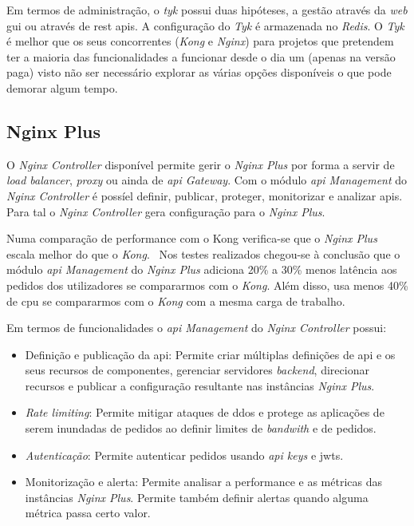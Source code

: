 Em termos de administração, o \textit{tyk} possui duas hipóteses, a gestão através da \textit{web} \acrshort{gui} ou através de \acrshort{rest} \acrshort{api}s. A configuração do \textit{Tyk} é armazenada no \textit{Redis}. O \textit{Tyk} é melhor que os seus concorrentes (\textit{Kong} e \textit{Nginx}) para projetos que pretendem ter a maioria das funcionalidades a funcionar desde o dia um (apenas na versão paga) visto não ser necessário explorar as várias opções disponíveis o que pode demorar algum tempo.~\cite{compAPIGat}

\subsection{Nginx Plus}

O \textit{Nginx Controller} disponível permite gerir o \textit{Nginx Plus} por forma a servir de \textit{load balancer}, \textit{proxy} ou ainda de \textit{\acrshort{api} Gateway}. Com o módulo \textit{\acrshort{api} Management} do \textit{Nginx Controller} é possíel definir, publicar, proteger, monitorizar e analizar \acrshort{api}s. Para tal o \textit{Nginx Controller} gera configuração para o \textit{Nginx Plus}.

Numa comparação de performance com o Kong verifica-se que o \textit{Nginx Plus} escala melhor do que o \textit{Kong}.~\cite{nginxPvsKong} Nos testes realizados chegou-se à conclusão que o módulo \textit{\acrshort{api} Management} do \textit{Nginx Plus} adiciona 20\% a 30\% menos latência aos pedidos dos utilizadores se compararmos com o \textit{Kong}. Além disso, usa menos 40\% de \acrshort{cpu} se compararmos com o \textit{Kong} com a mesma carga de trabalho.

Em termos de funcionalidades o \textit{\acrshort{api} Management} do \textit{Nginx Controller} possui:~\cite{nginxP}
\begin{itemize}
    \item Definição e publicação da \acrshort{api}: Permite criar múltiplas definições de \acrshort{api} e os seus recursos de componentes, gerenciar servidores \textit{backend}, direcionar recursos e publicar a configuração resultante nas instâncias \textit{Nginx Plus}.
    \item \textit{Rate limiting}: Permite mitigar ataques de \acrshort{ddos} e protege as aplicações de serem inundadas de pedidos ao definir limites de \textit{bandwith} e de pedidos.
    \item \textit{Autenticação}: Permite autenticar pedidos usando \textit{\acrshort{api} keys} e \acrshort{jwt}s.
    \item Monitorização e alerta: Permite analisar a performance e as métricas das instâncias \textit{Nginx Plus}. Permite também definir alertas quando alguma métrica passa certo valor.
\end{itemize}

